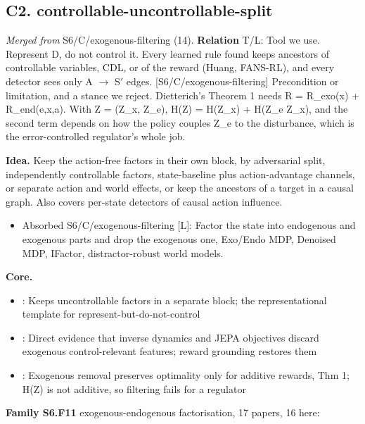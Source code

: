\documentclass[10pt]{article}
\newcommand{\memb}[1]{\par\smallskip\textbf{#1}\quad}
\begin{document}
\subsection{C2. controllable-uncontrollable-split}\label{node:S6-S6-C-controllable-uncontrollable-split}
\textit{Merged from} S6/C/exogenous-filtering (14). \textbf{Relation} \textsf{T}/\textsf{L}: Tool we use. Represent D, do not control it. Every learned rule found keeps ancestors of controllable variables, CDL, or of the reward (Huang, FANS-RL), and every detector sees only A \ensuremath{\to} S\ensuremath{'} edges. [S6/C/exogenous-filtering] Precondition or limitation, and a stance we reject. Dietterich's Theorem 1 needs R = R\_exo(x) + R\_end(e,x,a). With Z = (Z\_x, Z\_e), H(Z) = H(Z\_x) + H(Z\_e \textbar{} Z\_x), and the second term depends on how the policy couples Z\_e to the disturbance, which is the error-controlled regulator's whole job.

\textbf{Idea.} Keep the action-free factors in their own block, by adversarial split, independently controllable factors, state-baseline plus action-advantage channels, or separate action and world effects, or keep the ancestors of a target in a causal graph. Also covers per-state detectors of causal action influence.
\begin{itemize}[nosep,leftmargin=1.2em]
\item Absorbed S6/C/exogenous-filtering [L]: Factor the state into endogenous and exogenous parts and drop the exogenous one, Exo/Endo MDP, Denoised MDP, IFactor, distractor-robust world models.
\end{itemize}


\memb{Core.}
\begin{itemize}[nosep,leftmargin=1.2em]
\item \citet{Kooi-disentangled23}: Keeps uncontrollable factors in a separate block; the representational template for represent-but-do-not-control
\item \citet{Pendharkar-predictive26}: Direct evidence that inverse dynamics and JEPA objectives discard exogenous control-relevant features; reward grounding restores them
\item \citet{Dietterich-discovering18}: Exogenous removal preserves optimality only for additive rewards, Thm 1; H(Z) is not additive, so filtering fails for a regulator
\end{itemize}
\memb{Family S6.F11} exogenous-endogenous factorisation, 17 papers, 16 here: {\footnotesize \citetext{\citealp{Pan-isodream22}; \citealp{Pan-modelbased23}; \citealp{Li-dueling26}; \citealp{Zhang-dwm26}; \citealp{Dietterich-discovering18}; \citealp{Wang-denoised22}; \citealp{Liu-learning23}; \citealp{Gulati-contrast26}; \citealp{Efroni-sparsity21}; \citealp{Fu-learning21}; \citealp{Liu-exploiting21}; \citealp{Efroni-sampleefficient22}; \citealp{Trimponias-reinforcement23}; \citealp{Cao-rethinking24}; \citealp{Wang-building24}; \citealp{Islam-tasksense26}}}
\end{document}
